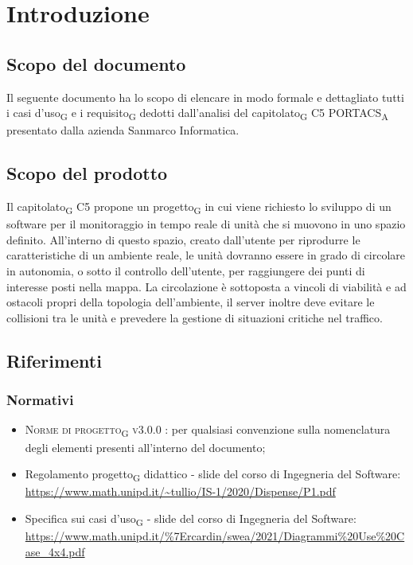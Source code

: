\section{Introduzione}
\subsection{Scopo del documento}
Il seguente documento ha lo scopo di elencare in modo formale e dettagliato tutti i casi d'uso\textsubscript{G} e i requisito\textsubscript{G} dedotti dall'analisi del capitolato\textsubscript{G} C5 PORTACS\textsubscript{A} presentato dalla azienda Sanmarco Informatica.

\subsection{Scopo del prodotto}
Il capitolato\textsubscript{G} C5 propone un progetto\textsubscript{G} in cui viene richiesto lo sviluppo di un software per il monitoraggio in tempo reale di unità che si muovono in uno spazio definito. All'interno di questo spazio, creato dall'utente per riprodurre le caratteristiche di un ambiente reale, le unità dovranno essere in grado di circolare in autonomia, o sotto il controllo dell'utente, per raggiungere dei punti di interesse posti nella mappa. La circolazione è sottoposta a vincoli di viabilità e ad ostacoli propri della topologia dell'ambiente, il server inoltre deve evitare le collisioni tra le unità e prevedere la gestione di situazioni critiche nel traffico.

\subsection{Riferimenti}
\subsubsection{Normativi}
\begin{itemize}
\item \textsc{Norme di progetto\textsubscript{G} v3.0.0 }: per qualsiasi convenzione sulla nomenclatura degli elementi presenti all'interno del documento;
\item Regolamento progetto\textsubscript{G} didattico - slide del corso di Ingegneria del Software: \\ \url{https://www.math.unipd.it/~tullio/IS-1/2020/Dispense/P1.pdf}
\item Specifica sui casi d'uso\textsubscript{G} - slide del corso di Ingegneria del Software: \\ \url{https://www.math.unipd.it/\%7Ercardin/swea/2021/Diagrammi\%20Use\%20Case_4x4.pdf}
\end{itemize}
